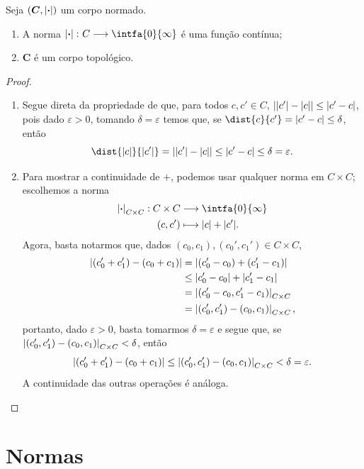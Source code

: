 \begin{prop}
Seja $(\bm C,\left\vert{\bm{\cdot}}\right\vert)$ um corpo normado.
	\begin{enumerate}
	\item A norma $\abs{\var}\colon C \to \intfa{0}{\infty}$ é uma função contínua;
	\item $\bm C$ é um corpo topológico.
	\end{enumerate}
\end{prop}
\begin{proof}
	\begin{enumerate}
	\item Segue direta da propriedade de que, para todos $c,c' \in C$, $\left\vert{\left\vert{c'}\right\vert-\left\vert{c}\right\vert}\right\vert \leq \left\vert{c'-c}\right\vert$, pois dado $\varepsilon > 0$, tomando $\delta=\varepsilon$ temos que, se $\dist{c}{c'} = \abs{c'-c} \leq \delta$, então
		\begin{equation*}
		\dist{\abs{c}}{\abs{c'}} = \abs{\abs{c'}-\abs{c}} \leq \abs{c'-c} \leq \delta = \varepsilon.
		\end{equation*}
	
	\item Para mostrar a continuidade de $+$, podemos usar qualquer norma em $C \times C$; escolhemos a norma
		\begin{align*}
		\func{\abs{\var}_{C \times C}}{C \times C}{\intfa{0}{\infty}}{(c,c')}{\abs{c}+\abs{c'}}.
		\end{align*}
Agora, basta notarmos que, dados $(c_0,c_1),(c_0',c_1') \in C \times C$,
	\begin{align*}
	\left\vert{(c_0'+c_1') - (c_0+c_1)}\right\vert &= \left\vert{(c_0' - c_0) + (c_1'-c_1)}\right\vert \\
		&\leq \left\vert{c_0'-c_0}\right\vert + \left\vert{c_1'-c_1}\right\vert \\
		&= \left\vert{(c_0'-c_0,c_1'-c_1)}\right\vert_{C \times C} \\
		&= \left\vert{(c_0',c_1')-(c_0,c_1)}\right\vert_{C \times C},
	\end{align*}
portanto, dado $\varepsilon>0$, basta tomarmos $\delta=\varepsilon$ e segue que, se $\left\vert{(c_0',c_1')-(c_0,c_1)}\right\vert_{C \times C} < \delta$, então
	\begin{equation*}
	\left\vert{(c_0'+c_1') - (c_0+c_1)}\right\vert \leq \left\vert{(c_0',c_1')-(c_0,c_1)}\right\vert_{C \times C} < \delta=\varepsilon.
	\end{equation*}
A continuidade das outras operações é análoga.
	\end{enumerate}
\end{proof}

\section{Normas}

